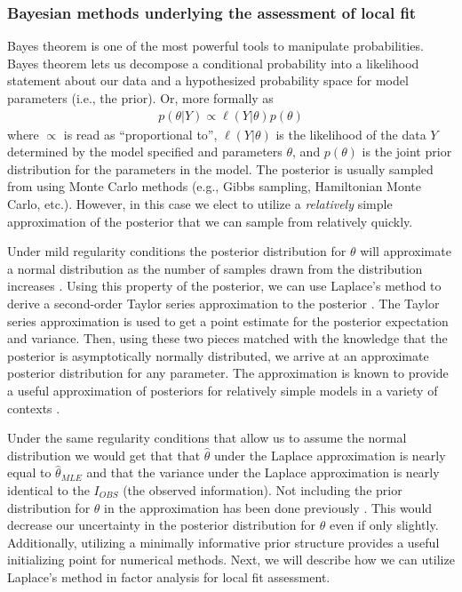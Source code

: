 \documentclass[noextraspace, floatsintext, 12pt]{apa7}
\begin{document}
\subsubsection{Bayesian methods underlying the assessment of local fit}

Bayes theorem is one of the most powerful tools to manipulate probabilities. 
Bayes theorem lets us decompose a conditional probability into a likelihood statement about our data and a hypothesized probability space for model parameters (i.e., the prior). Or, more formally as
\begin{align*}
p(\theta \vert Y) \propto \ell (Y \vert \theta)p(\theta)
\end{align*}
where $\propto$ is read as ``proportional to'', $\ell (Y \vert \theta)$ is the likelihood of the data $Y$ determined by the model specified and parameters $\theta$, and $p(\theta)$ is the joint prior distribution for the parameters in the model.
The posterior is usually sampled from using Monte Carlo methods (e.g., Gibbs sampling, Hamiltonian Monte Carlo, etc.).
However, in this case we elect to utilize a \textit{relatively} simple approximation of the posterior that we can sample from relatively quickly.

Under mild regularity conditions the posterior distribution for $\theta$ will approximate a normal distribution as the number of samples drawn from the distribution increases \citep{DBA3}.
Using this property of the posterior, we can use Laplace's method to derive a second-order Taylor series approximation to the posterior \citep{Tierney1986}.
The Taylor series approximation is used to get a point estimate for the posterior expectation and variance.
Then, using these two pieces matched with the knowledge that the posterior is asymptotically normally distributed, we arrive at an approximate posterior distribution for any parameter. 
The approximation is known to provide a useful approximation of posteriors for relatively simple models in a variety of contexts \citep{Kass1989, Rue2009}.

Under the same regularity conditions that allow us to assume the normal distribution we would get that that $\hat{\theta}$ under the Laplace approximation is nearly equal to $\hat{\theta}_{MLE}$ and that the variance under the Laplace approximation is nearly identical to the $I_{OBS}$  (the observed information). %
Not including the prior distribution for $\theta$ in the approximation has been done previously \citep{Lee2016, Rue2009, Wolfinger1993, Li1992}.
This would decrease our uncertainty in the posterior distribution for $\theta$ even if only slightly.
Additionally, utilizing a minimally informative prior structure provides a useful initializing point for numerical methods.
Next, we will describe how we can utilize Laplace's method in factor analysis for local fit assessment.
\end{document}
